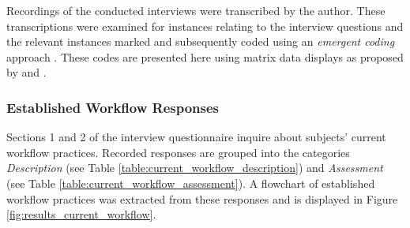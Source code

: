 
Recordings of the conducted interviews were transcribed by the author. These
transcriptions were examined for instances relating to the interview questions
and the relevant instances marked and subsequently coded using an
\textit{emergent coding} approach \citep[p.304]{lazar2017}. These codes are
presented here using matrix data displays as proposed by
\citet[p.254]{saldana2015} and \citet{henwood2003}.





\subsubsection{Established Workflow Responses}
\label{subsubsec:results_established_workflow}
Sections 1 and 2 of the interview questionnaire inquire about subjects' current
workflow practices. Recorded responses are grouped into the categories
\textit{Description} (see Table \ref{table:current_workflow_description}) and
\textit{Assessment} (see Table \ref{table:current_workflow_assessment}). A
flowchart of established workflow practices was extracted from these responses
and is displayed in Figure \ref{fig:results_current_workflow}.

